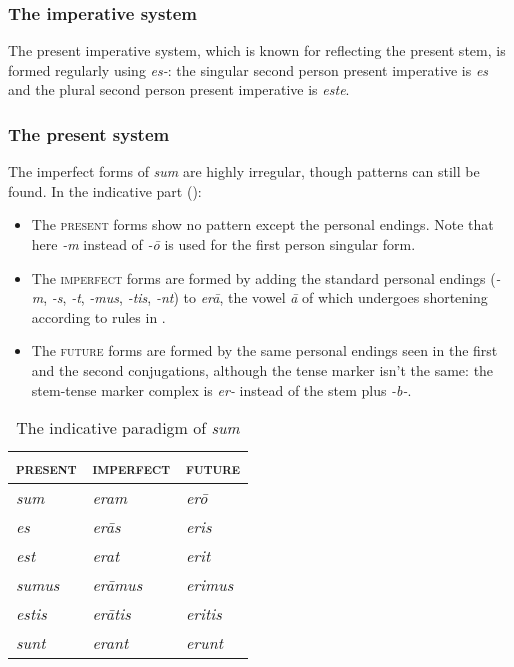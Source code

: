 \documentclass[a4paper, oneside, 12pt]{report}
\newcommand{\form}[1]{\emph{#1}}
\newcommand*{\category}[1]{\textsc{#1}}
\begin{document}
\subsubsection{The imperative system}

The present imperative system, 
which is known for reflecting the present stem,
is formed regularly using \form{es-}:
the singular second person present imperative is \form{es}
and the plural second person present imperative is \form{este}.

\subsubsection{The present system}

The imperfect forms of \form{sum} are highly irregular,
though patterns can still be found.
In the indicative part (): 
\begin{itemize}
    \item The \category{present} forms show no pattern
    except the personal endings.
    Note that here \form{-m} instead of \form{-\={o}}
    is used for the first person singular form.
    \item The \category{imperfect} forms are formed 
    by adding the standard personal endings 
    (\form{-m}, \form{-s}, \form{-t}, 
    \form{-mus}, \form{-tis}, \form{-nt})
    to \form{er\={a}},
    the vowel \form{\={a}} of which 
    undergoes shortening according to rules in .
    \item The \category{future} forms are formed by 
    the same personal endings seen in the first and the second conjugations,
    although the tense marker isn't the same: 
    the stem-tense marker complex is \form{er-}
    instead of the stem plus \form{-b-}.
\end{itemize}

\begin{table}[H]
    \caption{The indicative paradigm of \form{sum}}
    \label{tbl:indicative-sum}
    \centering
    \begin{tabular}{lll}
    \toprule
    \category{present} & \category{imperfect}  & \category{future}  \\
    \midrule
    \form{sum}     & \form{eram}       & \form{er\={o}} \\
    \form{es}      & \form{er\={a}s}   & \form{eris}    \\
    \form{est}     & \form{erat}       & \form{erit}    \\
    \form{sumus}   & \form{er\={a}mus} & \form{erimus}  \\
    \form{estis}   & \form{er\={a}tis} & \form{eritis}  \\
    \form{sunt}    & \form{erant}      & \form{erunt}   \\ \bottomrule
    \end{tabular}
\end{table}
\end{document}
